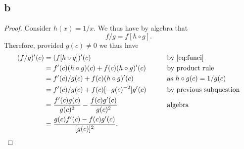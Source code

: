 \documentclass[10pt]{article}
\begin{document}
\subsection*{b}
    \begin{proof}
        Consider $h(x)=1/x.$ We thus have by algebra that
        \begin{equation} \label{eq:funci}
            f/g = f[h\circ g].
        \end{equation}
        Therefore, provided $g(c)\neq 0$ we thus have
        \begin{alignat*}{2}
            (f/g)'(c) &= (f[h\circ g])'(c) &&\text{by \eqref{eq:funci}}\\
            &=f'(c)(h\circ g)(c) + f(c) (h\circ g)'(c) &&\text{by product rule}\\
            &= f'(c)/g(c) + f(c)(h\circ g)'(c) &&\text{as }h\circ g(c)=1/g(c)\\
            &= f'(c)/g(c) + f(c)[-g(c)^{-2}]g'(c) \qquad&&\text{by previous subquestion}\\
            &= \frac{f'(c)g(c)}{g(c)^2} - \frac{f(c)g'(c)}{g(c)^2}\  &&\text{algebra}\\
            &= \frac{g(c)f'(c)-f(c)g'(c)}{[g(c)]^2}.
        \end{alignat*}
    \end{proof}
\end{document}
